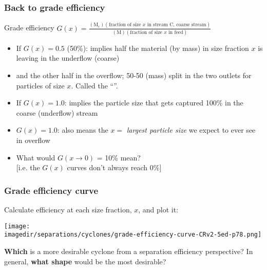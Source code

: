 \begin{frame}\frametitle{Back to grade efficiency}
	\begin{exampleblock}{Grade efficiency}
		$G(x) = \displaystyle \frac{(\text{M}_\text{c})(\text{fraction of size $x$ in stream C, coarse stream})}{(\text{M})(\text{fraction of size $x$ in feed})}$
	\end{exampleblock}
	\begin{itemize}
		\item	If $G(x) = 0.5$ (50\%): implies half the material (by mass) in size fraction $x$ is leaving in the underflow (coarse)
		\item	and the other half in the overflow; 50-50 (mass) split in the two outlets for particles of size $x$. Called the ``{\color{purple}{cut size}}''.
		\item	If $G(x) = 1.0$: implies the particle size that gets captured 100\%  in the coarse (underflow) stream
		\item	$G(x) = 1.0$: also means the $x=$ \emph{largest particle size} we expect to ever see in overflow
		\item	\adv What would $G(x \rightarrow 0)$ = 10\% mean? \\{\scriptsize [i.e. the $G(x)$ curves don't always reach 0\%]}
	\end{itemize}
\end{frame}

\begin{frame}\frametitle{Grade efficiency curve}
	Calculate efficiency at each size fraction, $x$, and plot it:
	\begin{center}
		\texttt{[image: \\imagedir/separations/cyclones/grade-efficiency-curve-CRv2-5ed-p78.png]}
	\end{center}
	{\color{myOrange}\textbf{Which} is a more desirable cyclone} from a separation efficiency perspective? In general, {\color{myOrange}\textbf{what shape}} would be the most desirable?
\end{frame}

